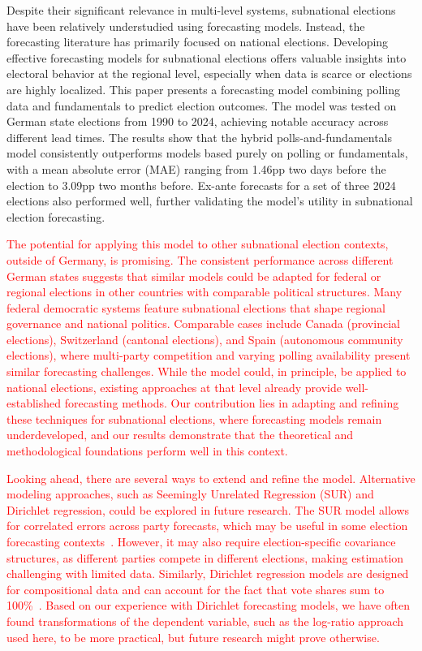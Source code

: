 \documentclass[doublespaced,12pt]{article}
\begin{document}
\begin{doublespacing}
Despite their significant relevance in multi-level systems, subnational elections have been relatively understudied using forecasting models. Instead, the forecasting literature has primarily focused on national elections. Developing effective forecasting models for subnational elections offers valuable insights into electoral behavior at the regional level, especially when data is scarce or elections are highly localized. This paper presents a forecasting model combining polling data and fundamentals to predict election outcomes. The model was tested on German state elections from 1990 to 2024, achieving notable accuracy across different lead times. The results show that the hybrid polls-and-fundamentals model consistently outperforms models based purely on polling or fundamentals, with a mean absolute error (MAE) ranging from 1.46pp two days before the election to 3.09pp two months before. Ex-ante forecasts for a set of three 2024 elections also performed well, further validating the model's utility in subnational election forecasting.

\textcolor{red}{The potential for applying this model to other subnational election contexts, outside of Germany, is promising. The consistent performance across different German states suggests that similar models could be adapted for federal or regional elections in other countries with comparable political structures. Many federal democratic systems feature subnational elections that shape regional governance and national politics. Comparable cases include Canada (provincial elections), Switzerland (cantonal elections), and Spain (autonomous community elections), where multi-party competition and varying polling availability present similar forecasting challenges. While the model could, in principle, be applied to national elections, existing approaches at that level already provide well-established forecasting methods. Our contribution lies in adapting and refining these techniques for subnational elections, where forecasting models remain underdeveloped, and our results demonstrate that the theoretical and methodological foundations perform well in this context.}

\textcolor{red}{Looking ahead, there are several ways to extend and refine the model. Alternative modeling approaches, such as Seemingly Unrelated Regression (SUR) and Dirichlet regression, could be explored in future research. The SUR model allows for correlated errors across party forecasts, which may be useful in some election forecasting contexts~\citep[see e.g.,][]{mongrain202110}. However, it may also require election-specific covariance structures, as different parties compete in different elections, making estimation challenging with limited data. Similarly, Dirichlet regression models are designed for compositional data and can account for the fact that vote shares sum to 100\%~\citep[see e.g.,][]{hanretty2021forecasting, Stoetzer_Neunhoeffer_Gschwend_Munzert_Sternberg_2019}. Based on our experience with Dirichlet forecasting models, we have often found transformations of the dependent variable, such as the log-ratio approach used here, to be more practical, but future research might prove otherwise.}


\end{doublespacing}
\end{document}
